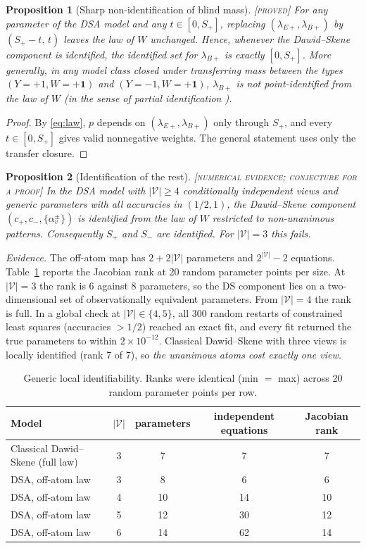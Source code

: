 \documentclass[11pt]{article}
\newtheorem{proposition}{Proposition}
\theoremstyle{definition}
\theoremstyle{remark}
\newcommand{\status}[1]{\hfill{\normalfont\small\textsc{[#1]}}}
\newcommand{\cV}{\mathcal{V}}
\newcommand{\one}{\mathbf{1}}
\begin{document}
\begin{proposition}[Sharp non-identification of blind mass]\label{prop:nonid}\status{proved}
For any parameter of the DSA model and any $t\in[0,S_+]$, replacing $(\lambda_{E+},\lambda_{B+})$ by $(S_+-t,\,t)$ leaves the law of $W$ unchanged. Hence, whenever the Dawid--Skene component is identified, the identified set for $\lambda_{B+}$ is exactly $[0,S_+]$. More generally, in any model class closed under transferring mass between the types $(Y=+1,W=+\one)$ and $(Y=-1,W=+\one)$, $\lambda_{B+}$ is not point-identified from the law of $W$ (in the sense of partial identification \cite{manski2003}).
\end{proposition}
\begin{proof}
By \eqref{eq:law}, $p$ depends on $(\lambda_{E+},\lambda_{B+})$ only through $S_+$, and every $t\in[0,S_+]$ gives valid nonnegative weights. The general statement uses only the transfer closure.
\end{proof}

\begin{proposition}[Identification of the rest]\label{prop:id}\status{numerical evidence; conjecture for a proof}
In the DSA model with $|\cV|\ge 4$ conditionally independent views and generic parameters with all accuracies in $(1/2,1)$, the Dawid--Skene component $(c_+,c_-,\{\alpha_v^{\pm}\})$ is identified from the law of $W$ restricted to non-unanimous patterns. Consequently $S_+$ and $S_-$ are identified. For $|\cV|=3$ this fails.
\end{proposition}

\noindent\emph{Evidence.} The off-atom map has $2+2|\cV|$ parameters and $2^{|\cV|}-2$ equations. Table~\ref{tab:rank} reports the Jacobian rank at 20 random parameter points per size. At $|\cV|=3$ the rank is 6 against 8 parameters, so the DS component lies on a two-dimensional set of observationally equivalent parameters. From $|\cV|=4$ the rank is full. In a global check at $|\cV|\in\{4,5\}$, all 300 random restarts of constrained least squares (accuracies $>1/2$) reached an exact fit, and every fit returned the true parameters to within $2\times10^{-12}$. Classical Dawid--Skene with three views is locally identified (rank 7 of 7), so \emph{the unanimous atoms cost exactly one view.}

\begin{table}[t]
\centering\small
\begin{tabular}{@{}lcccc@{}}
\toprule
Model & $|\cV|$ & parameters & independent equations & Jacobian rank\\
\midrule
Classical Dawid--Skene (full law) & 3 & 7 & 7 & 7\\
DSA, off-atom law & 3 & 8 & 6 & 6\\
DSA, off-atom law & 4 & 10 & 14 & 10\\
DSA, off-atom law & 5 & 12 & 30 & 12\\
DSA, off-atom law & 6 & 14 & 62 & 14\\
\bottomrule
\end{tabular}
\caption{Generic local identifiability. Ranks were identical (min $=$ max) across 20 random parameter points per row.}
\label{tab:rank}
\end{table}
\end{document}
